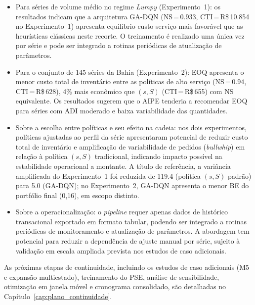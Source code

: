 \begin{itemize}
  \item Para séries de volume médio no regime \textit{Lumpy} (Experimento~1): os resultados indicam que a arquitetura GA-DQN (NS\,=\,$0.933$, CTI\,=\,R\$\,10.854 no Experimento~1) apresenta equilíbrio custo-serviço mais favorável que as heurísticas clássicas neste recorte. O treinamento é realizado uma única vez por série e pode ser integrado a rotinas periódicas de atualização de parâmetros.

  \item Para o conjunto de 145 séries da Bahia (Experimento~2): EOQ apresenta o menor custo total de inventário entre as políticas de alto serviço (NS\,=\,$0.94$, CTI\,=\,R\$\,628), 4\% mais econômico que $(s,S)$ (CTI\,=\,R\$\,655) com NS equivalente. Os resultados sugerem que o AIPE tenderia a recomendar EOQ para séries com ADI moderado e baixa variabilidade das quantidades.

  \item Sobre a escolha entre políticas e seu efeito na cadeia: nos dois experimentos, políticas ajustadas ao perfil da série apresentaram potencial de reduzir custo total de inventário e amplificação de variabilidade de pedidos (\textit{bullwhip}) em relação à política $(s,S)$ tradicional, indicando impacto possível na estabilidade operacional a montante. A título de referência, a variância amplificada do Experimento~1 foi reduzida de 119.4 (política $(s,S)$ padrão) para 5.0 (GA-DQN); no Experimento~2, GA-DQN apresenta o menor BE do portfólio final (0,16), em escopo distinto.

  \item Sobre a operacionalização: o \textit{pipeline} requer apenas dados de histórico transacional exportado em formato tabular, podendo ser integrado a rotinas periódicas de monitoramento e atualização de parâmetros. A abordagem tem potencial para reduzir a dependência de ajuste manual por série, sujeito à validação em escala ampliada prevista nos estudos de caso adicionais.
\end{itemize}

As próximas etapas de continuidade, incluindo os estudos de caso adicionais (M5 e expansão multiestado), treinamento do PSE, análise de sensibilidade, otimização em janela móvel e cronograma consolidado, são detalhadas no Capítulo~\ref{cap:plano_continuidade}.
